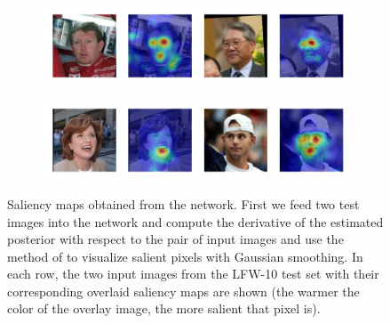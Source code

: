 \begin{figure}
    \begin{subfigure}
        \centering
        \includegraphics[width=0.75\linewidth, trim={0 1cm 0 0},clip]{saliency-new/saliency-smooth/eyesopen-1.jpeg}
        \footnotesize
        \vspace{0.4cm}
    \end{subfigure}
    
    \begin{subfigure}
        \centering
        \includegraphics[width=0.75\linewidth, trim={0 1cm 0 0},clip]{saliency-new/saliency-smooth/goodlooking-1.jpeg}
        \footnotesize
    \end{subfigure}
    
    \caption{Saliency maps obtained from the network. First we feed two test images into the network and compute the derivative of the estimated posterior with respect to the pair of input images and use the method of \cite{saliency} to visualize salient pixels with Gaussian smoothing. In each row, the two input images from the LFW-10 test set with their corresponding overlaid saliency maps are shown (the warmer the color of the overlay image, the more salient that pixel is).}
    \label{fig.5}
\end{figure}
